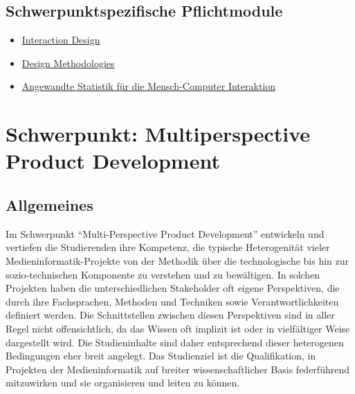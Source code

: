 \section*{Schwerpunktspezifische
Pflichtmodule\label{/mi-2017/modulbeschreibungen-master/schwerpunkt-human-computer-interaction}}\label{schwerpunktspezifische-pflichtmodulepathlabelmi-2017modulbeschreibungen-masterschwerpunkt-human-computer-interaction}

\begin{itemize}
\tightlist
\item
  \hyperref[/mi-2017/modulbeschreibungen-master/MA_HCI_InteractionDesign]{Interaction
  Design}
\item
  \hyperref[/mi-2017/modulbeschreibungen-master/MA_HCI_Design_Methodologies]{Design
  Methodologies}
\item
  \hyperref[/mi-2017/modulbeschreibungen-master/MA_HCI_Modul_Statistical_Methods_for_HCI]{Angewandte
  Statistik für die Mensch-Computer Interaktion}
\end{itemize}

\chapter{Schwerpunkt: Multiperspective Product
Development\label{/mi-2017/modulbeschreibungen-master/schwerpunkt-multiperspective-product-development}}\label{schwerpunkt-multiperspective-product-developmentpathlabelmi-2017modulbeschreibungen-masterschwerpunkt-multiperspective-product-development}

\section*{Allgemeines\label{/mi-2017/modulbeschreibungen-master/schwerpunkt-multiperspective-product-development}}\label{allgemeinespathlabelmi-2017modulbeschreibungen-masterschwerpunkt-multiperspective-product-development}

Im Schwerpunkt ``Multi-Perspective Product Development'' entwickeln und
vertiefen die Studierenden ihre Kompetenz, die typische Heterogenität
vieler Medieninformatik-Projekte von der Methodik über die
technologische bis hin zur sozio-technischen Komponente zu verstehen und
zu bewältigen. In solchen Projekten haben die unterschiedlichen
Stakeholder oft eigene Perspektiven, die durch ihre Fachsprachen,
Methoden und Techniken sowie Verantwortlichkeiten definiert werden. Die
Schnittstellen zwischen diesen Perspektiven sind in aller Regel nicht
offensichtlich, da das Wissen oft implizit ist oder in vielfältiger
Weise dargestellt wird. Die Studieninhalte sind daher entsprechend
dieser heterogenen Bedingungen eher breit angelegt. Das Studienziel ist
die Qualifikation, in Projekten der Medieninformatik auf breiter
wissenschaftlicher Basis federführend mitzuwirken und sie organisieren
und leiten zu können.

